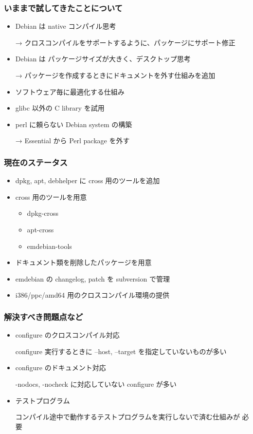\documentclass[cjk,dvipdfmx,12pt]{beamer}
\begin{document}
\begin{frame} 
\frametitle{いままで試してきたことについて}
  \begin{itemize}
    \item Debian は native コンパイル思考

	→ クロスコンパイルをサポートするように、パッケージにサポート修正

    \item Debian は パッケージサイズが大きく、デスクトップ思考
	
	→ パッケージを作成するときにドキュメントを外す仕組みを追加

    \item ソフトウェア毎に最適化する仕組み

    \item glibc 以外の C library を試用

    \item perl に頼らない Debian system の構築

	→ Essential から Perl package を外す
  \end{itemize}
\end{frame}


\begin{frame} 
\frametitle{現在のステータス}
  \begin{itemize}
    \item dpkg, apt, debhelper に cross 用のツールを追加
    \item cross 用のツールを用意

	\begin{itemize}
		\item dpkg-cross
		\item apt-cross
		\item emdebian-tools
	\end{itemize}
    \item ドキュメント類を削除したパッケージを用意
    \item emdebian の changelog, patch を subversion で管理
    \item i386/ppc/amd64 用のクロスコンパイル環境の提供 
  \end{itemize}
\end{frame}


\begin{frame} 
\frametitle{解決すべき問題点など}
  \begin{itemize}
    \item configure のクロスコンパイル対応

	configure 実行するときに --host, --target を指定していないものが多い

    \item configure のドキュメント対応

	-nodocs, -nocheck に対応していない configure が多い

    \item テストプログラム

	コンパイル途中で動作するテストプログラムを実行しないで済む仕組みが
	必要 
  \end{itemize}
\end{frame}
\end{document}
